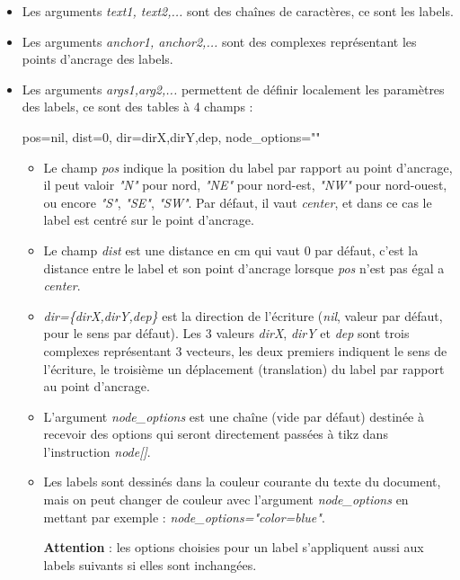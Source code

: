 \begin{itemize}
    \begin{itemize}
    \item  Les arguments \emph{text1, text2,...} sont des chaînes de caractères, ce sont les labels.
    \item  Les arguments \emph{anchor1, anchor2,...} sont des complexes représentant les points d'ancrage des labels.
    \item  Les arguments \emph{args1,arg2,...}  permettent de définir localement les paramètres des labels, ce sont des tables à 4 champs :
\begin{TeXcode}
    { pos=nil, dist=0, dir={dirX,dirY,dep}, node_options="" }
\end{TeXcode}
        \begin{itemize}
            \item Le champ \emph{pos} indique la position du label par rapport au point d'ancrage, il peut valoir \emph{"N"} pour nord, \emph{"NE"} pour nord-est, \emph{"NW"} pour nord-ouest, ou encore \emph{"S"}, \emph{"SE"}, \emph{"SW"}. Par défaut, il vaut \emph{center}, et dans ce cas le label est centré sur le point  d'ancrage.
            \item Le champ \emph{dist} est une distance en cm qui vaut $0$ par défaut, c'est la distance entre le label et son point d'ancrage lorsque \emph{pos} n'est pas égal a \emph{center}.
            \item \emph{dir=\{dirX,dirY,dep\}} est la direction de l'écriture (\emph{nil}, valeur par défaut, pour le sens par défaut). Les 3 valeurs \emph{dirX}, \emph{dirY} et \emph{dep} sont trois complexes représentant 3 vecteurs, les deux premiers indiquent le sens de l'écriture, le troisième un déplacement (translation) du label par rapport au point d'ancrage.
            \item L'argument \emph{node\_options} est une chaîne (vide par défaut) destinée à recevoir des options qui seront directement passées à tikz dans l'instruction \emph{node{[}{]}}.
            \item Les labels sont dessinés dans la couleur courante du texte du document, mais on peut changer de couleur avec l'argument \emph{node\_options} en mettant par exemple : \emph{node\_options="color=blue"}.
            
            \textbf{Attention} : les options choisies pour un label s'appliquent aussi aux labels suivants si elles sont inchangées.
        \end{itemize}
  \end{itemize}


\end{itemize}
